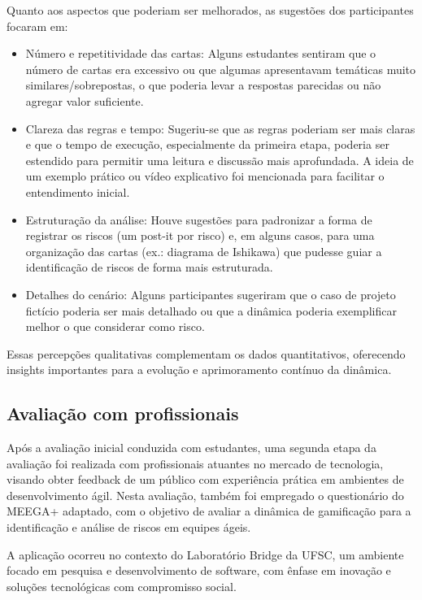 \documentclass[
	12pt,
	openright,
	twoside,
	a4paper,
	english,
	brazil
	]{abntex2}
\begin{document}
Quanto aos aspectos que poderiam ser melhorados, as sugestões dos participantes focaram em:
\begin{itemize}
  \item Número e repetitividade das cartas: Alguns estudantes sentiram que o número de cartas era excessivo ou que algumas apresentavam temáticas muito similares/sobrepostas, o que poderia levar a respostas parecidas ou não agregar valor suficiente.
  \item Clareza das regras e tempo: Sugeriu-se que as regras poderiam ser mais claras e que o tempo de execução, especialmente da primeira etapa, poderia ser estendido para permitir uma leitura e discussão mais aprofundada. A ideia de um exemplo prático ou vídeo explicativo foi mencionada para facilitar o entendimento inicial.
  \item Estruturação da análise: Houve sugestões para padronizar a forma de registrar os riscos (um post-it por risco) e, em alguns casos, para uma organização das cartas (ex.: diagrama de Ishikawa) que pudesse guiar a identificação de riscos de forma mais estruturada.
  \item Detalhes do cenário: Alguns participantes sugeriram que o caso de projeto fictício poderia ser mais detalhado ou que a dinâmica poderia exemplificar melhor o que considerar como risco.
\end{itemize}

Essas percepções qualitativas complementam os dados quantitativos, oferecendo insights importantes para a evolução e aprimoramento contínuo da dinâmica.


\subsection{Avaliação com profissionais}

Após a avaliação inicial conduzida com estudantes, uma segunda etapa da avaliação foi realizada com profissionais atuantes no mercado de tecnologia, visando obter feedback de um público com experiência prática em ambientes de desenvolvimento ágil. Nesta avaliação, também foi empregado o questionário do MEEGA+ adaptado, com o objetivo de avaliar a dinâmica de gamificação para a identificação e análise de riscos em equipes ágeis.

A aplicação ocorreu no contexto do Laboratório Bridge da UFSC, um ambiente focado em pesquisa e desenvolvimento de software, com ênfase em inovação e soluções tecnológicas com compromisso social.
\end{document}
